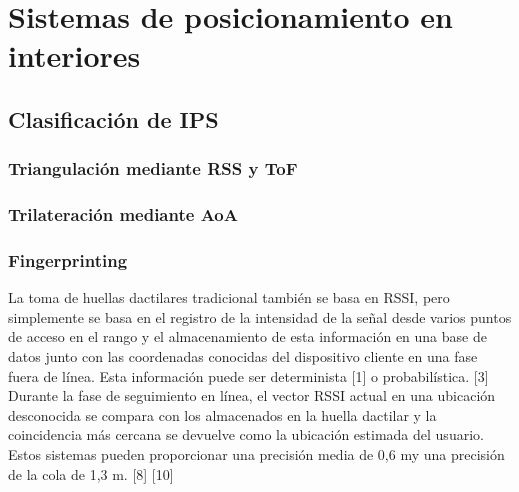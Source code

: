 \chapter{Sistemas de posicionamiento en interiores}

\section{Clasificación de IPS}


\subsection{Triangulación mediante RSS y ToF}


\subsection{Trilateración mediante AoA}

\subsection{Fingerprinting}



La toma de huellas dactilares tradicional también se basa en RSSI, pero simplemente se basa en el registro de la intensidad de la señal desde varios puntos de acceso en el rango y el almacenamiento de esta información en una base de datos junto con las coordenadas conocidas del dispositivo cliente en una fase fuera de línea. Esta información puede ser determinista [1] o probabilística. [3] Durante la fase de seguimiento en línea, el vector RSSI actual en una ubicación desconocida se compara con los almacenados en la huella dactilar y la coincidencia más cercana se devuelve como la ubicación estimada del usuario. Estos sistemas pueden proporcionar una precisión media de 0,6 my una precisión de la cola de 1,3 m. [8] [10]


